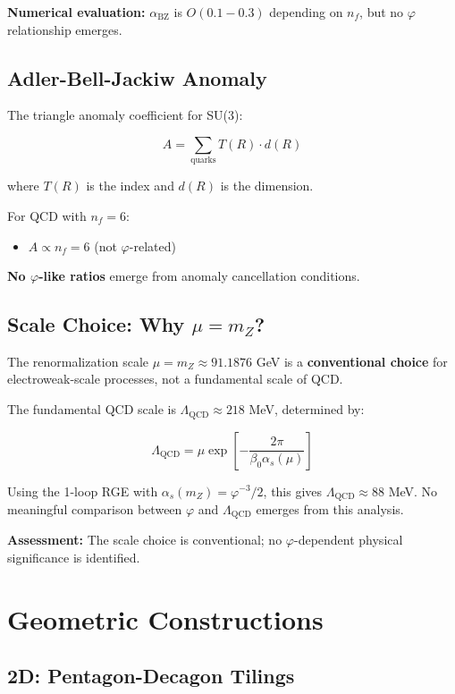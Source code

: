 \documentclass{article}
\begin{document}
\textbf{Numerical evaluation:} $\alpha_{\text{BZ}}$ is $O(0.1-0.3)$ depending on $n_f$, but no $\varphi$ relationship emerges.

\subsection{Adler-Bell-Jackiw Anomaly}

The triangle anomaly coefficient for SU(3):

\[
A = \sum_{\text{quarks}} T(R) \cdot d(R)
\]

where $T(R)$ is the index and $d(R)$ is the dimension.

For QCD with $n_f = 6$:
\begin{itemize}
\item $A \propto n_f = 6$ (not $\varphi$-related)
\end{itemize}

\textbf{No $\varphi$-like ratios} emerge from anomaly cancellation conditions.

\subsection{Scale Choice: Why $\mu = m_Z$?}

The renormalization scale $\mu = m_Z \approx 91.1876$ GeV is a \textbf{conventional choice} for electroweak-scale processes, not a fundamental scale of QCD.

The fundamental QCD scale is $\Lambda_{\text{QCD}} \approx 218$ MeV, determined by:

\[
\Lambda_{\text{QCD}} = \mu \exp\left[-\frac{2\pi}{\beta_0 \alpha_s(\mu)}\right]
\]

Using the 1-loop RGE with $\alpha_s(m_Z) = \varphi^{-3}/2$, this gives $\Lambda_{\text{QCD}} \approx 88$ MeV. No meaningful comparison between $\varphi$ and $\Lambda_{\text{QCD}}$ emerges from this analysis.

\textbf{Assessment:} The scale choice is conventional; no $\varphi$-dependent physical significance is identified.

\section{Geometric Constructions}

\subsection{2D: Pentagon-Decagon Tilings}
\end{document}
